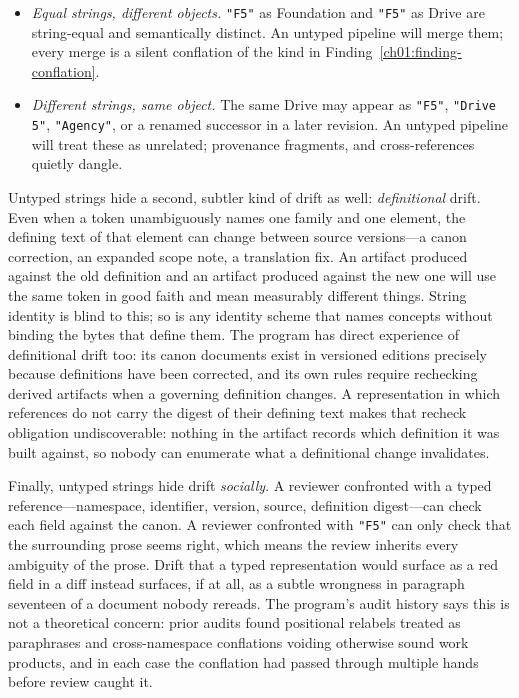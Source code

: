 \begin{itemize}
\item \emph{Equal strings, different objects.} \texttt{"F5"} as Foundation
and \texttt{"F5"} as Drive are string-equal and semantically distinct. An
untyped pipeline will merge them; every merge is a silent conflation of
the kind in Finding~\ref{ch01:finding-conflation}.
\item \emph{Different strings, same object.} The same Drive may appear as
\texttt{"F5"}, \texttt{"Drive 5"}, \texttt{"Agency"}, or a renamed
successor in a later revision. An untyped pipeline will treat these as
unrelated; provenance fragments, and cross-references quietly dangle.
\end{itemize}

Untyped strings hide a second, subtler kind of drift as well:
\emph{definitional} drift. Even when a token unambiguously names one family
and one element, the defining text of that element can change between
source versions---a canon correction, an expanded scope note, a translation
fix. An artifact produced against the old definition and an artifact
produced against the new one will use the same token in good faith and
mean measurably different things. String identity is blind to this; so is
any identity scheme that names concepts without binding the bytes that
define them. The program has direct experience of definitional drift too:
its canon documents exist in versioned editions precisely because
definitions have been corrected, and its own rules require rechecking
derived artifacts when a governing definition changes. A representation in
which references do not carry the digest of their defining text makes that
recheck obligation undiscoverable: nothing in the artifact records which
definition it was built against, so nobody can enumerate what a
definitional change invalidates.

Finally, untyped strings hide drift \emph{socially}. A reviewer confronted
with a typed reference---namespace, identifier, version, source, definition
digest---can check each field against the canon. A reviewer confronted with
\texttt{"F5"} can only check that the surrounding prose seems right, which
means the review inherits every ambiguity of the prose. Drift that a typed
representation would surface as a red field in a diff instead surfaces, if
at all, as a subtle wrongness in paragraph seventeen of a document nobody
rereads. The program's audit history says this is not a theoretical
concern: prior audits found positional relabels treated as paraphrases and
cross-namespace conflations voiding otherwise sound work products, and in
each case the conflation had passed through multiple hands before review
caught it.

